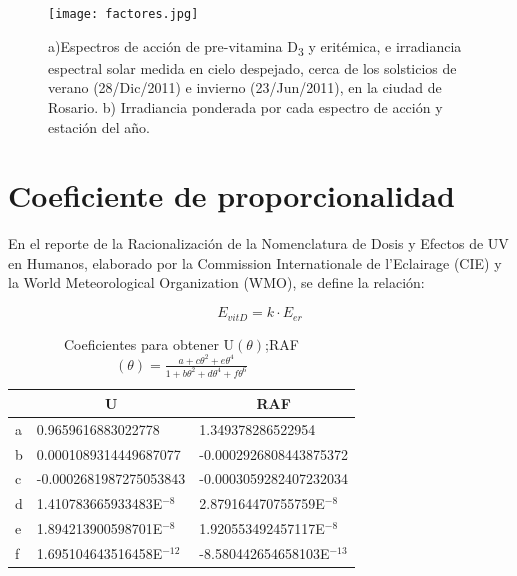 \documentclass[10pt,twocolumn]{article}
\begin{document}
\begin{figure}[ht]
  \centering
  \texttt{[image: factores.jpg]}
  \caption{a)Espectros de acción de pre-vitamina D\textsubscript{3} y eritémica, e irradiancia espectral solar medida en cielo despejado, cerca de los solsticios de verano (28/Dic/2011) e invierno (23/Jun/2011), en la ciudad de Rosario. b) Irradiancia ponderada por cada espectro de acción y estación del año.}
  \label{fig:factores}
\end{figure}

\section{Coeficiente de proporcionalidad}
En el reporte de la Racionalización de la Nomenclatura de Dosis y Efectos de UV en Humanos\cite{UVDoses}, elaborado por la Commission Internationale de l’Eclairage (CIE) y la World Meteorological Organization (WMO), se define la relación:

\begin{equation}
  E_{vitD} = k \cdot E_{er}
  \label{ee:CIE}
\end{equation}
\begin{table}[ht]
  \centering
  \caption{Coeficientes\cite{Herman2010} para obtener U$(\theta)$;RAF $(\theta)= \frac{a+c\theta^2+e\theta^4}{1+b\theta^2+d\theta^4+f\theta^6}$}
  \label{table::parametros}
  \begin{tabular}{lll}
    \hline
      & \multicolumn{1}{c}{U}      & \multicolumn{1}{c}{RAF}     \\ \hline
    a & 0.9659616883022778         & 1.349378286522954           \\
    b & 0.0001089314449687077      & -0.0002926808443875372      \\
    c & -0.0002681987275053843     & -0.0003059282407232034      \\
    d & 1.410783665933483E$^{-8 }$ & 2.879164470755759E$^{-8}$   \\
    e & 1.894213900598701E$^{-8 }$ & 1.920553492457117E$^{-8}$   \\
    f & 1.695104643516458E$^{-12}$ & -8.580442654658103E$^{-13}$ \\ \hline
  \end{tabular}
\end{table}
\end{document}
